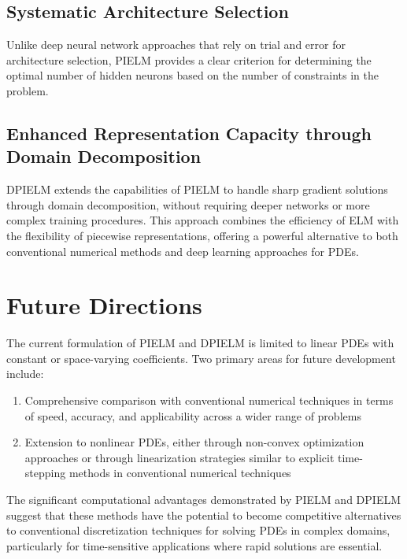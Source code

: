 \documentclass[11pt]{article}
\begin{document}
\subsection{Systematic Architecture Selection}

Unlike deep neural network approaches that rely on trial and error for architecture selection, PIELM provides a clear criterion for determining the optimal number of hidden neurons based on the number of constraints in the problem.

\subsection{Enhanced Representation Capacity through Domain Decomposition}

DPIELM extends the capabilities of PIELM to handle sharp gradient solutions through domain decomposition, without requiring deeper networks or more complex training procedures. This approach combines the efficiency of ELM with the flexibility of piecewise representations, offering a powerful alternative to both conventional numerical methods and deep learning approaches for PDEs.

\section{Future Directions}

The current formulation of PIELM and DPIELM is limited to linear PDEs with constant or space-varying coefficients. Two primary areas for future development include:

\begin{enumerate}
    \item Comprehensive comparison with conventional numerical techniques in terms of speed, accuracy, and applicability across a wider range of problems
    \item Extension to nonlinear PDEs, either through non-convex optimization approaches or through linearization strategies similar to explicit time-stepping methods in conventional numerical techniques
\end{enumerate}

The significant computational advantages demonstrated by PIELM and DPIELM suggest that these methods have the potential to become competitive alternatives to conventional discretization techniques for solving PDEs in complex domains, particularly for time-sensitive applications where rapid solutions are essential.
\end{document}
